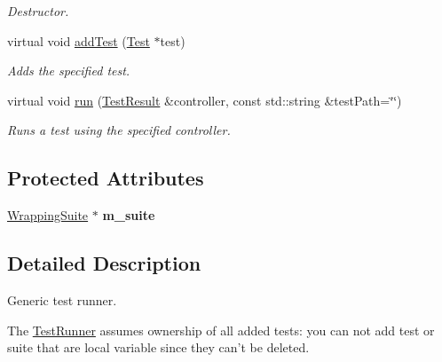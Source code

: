 \begin{DoxyCompactItemize}
\begin{DoxyCompactList}\small\item\em Destructor. \end{DoxyCompactList}\item 
virtual void \hyperlink{class_test_runner_ab9f9503b09b0002615869f39b23680d5}{add\+Test} (\hyperlink{class_test}{Test} $\ast$test)
\begin{DoxyCompactList}\small\item\em Adds the specified test. \end{DoxyCompactList}\item 
virtual void \hyperlink{class_test_runner_aa6a62ec693b671ed1d73b2184d012733}{run} (\hyperlink{class_test_result}{Test\+Result} \&controller, const std\+::string \&test\+Path=\char`\"{}\char`\"{})
\begin{DoxyCompactList}\small\item\em Runs a test using the specified controller. \end{DoxyCompactList}\end{DoxyCompactItemize}
\subsection*{Protected Attributes}
\begin{DoxyCompactItemize}
\item 
\hypertarget{class_test_runner_a765950cb25e116562dd450b850ba5b49}{\hyperlink{class_test_runner_1_1_wrapping_suite}{Wrapping\+Suite} $\ast$ {\bfseries m\+\_\+suite}}\label{class_test_runner_a765950cb25e116562dd450b850ba5b49}

\end{DoxyCompactItemize}


\subsection{Detailed Description}
Generic test runner.

The \hyperlink{class_test_runner}{Test\+Runner} assumes ownership of all added tests\+: you can not add test or suite that are local variable since they can't be deleted. 

